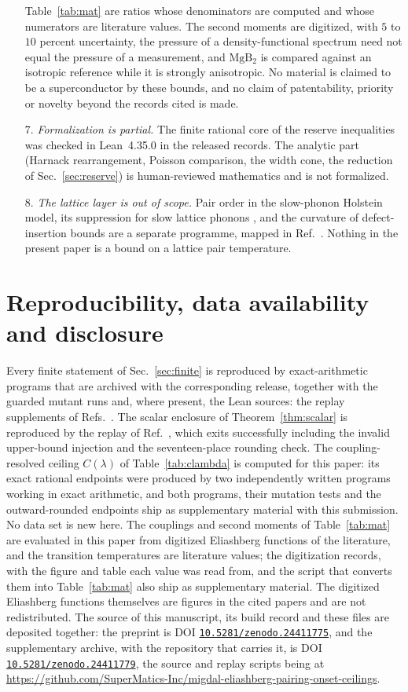 \documentclass[aps,10pt,superscriptaddress,floatfix,amsmath,amssymb,nofootinbib]{revtex4-2}
\newcommand{\DOI}[1]{\href{https://doi.org/#1}{\nolinkurl{#1}}}
\newcommand*{\PAPERDOI}{10.5281/zenodo.24411775}
\newcommand*{\SUPPLEMENTDOI}{10.5281/zenodo.24411779}
\begin{document}
\begin{enumerate}
Table~\ref{tab:mat} are ratios whose denominators are computed and whose numerators are
literature values. The second moments are digitized, with $5$ to $10$ percent uncertainty,
the pressure of a density-functional spectrum need not equal the pressure of a measurement,
and $\mathrm{MgB_{2}}$ is compared against an isotropic reference while it is strongly
anisotropic. No material is claimed to be a superconductor by these bounds, and no claim of
patentability, priority or novelty beyond the records cited is made.
\item[\rm 7.] \emph{Formalization is partial.} The finite rational core of the reserve
inequalities was checked in Lean~4.35.0 in the released records. The analytic part (Harnack
rearrangement, Poisson comparison, the width cone, the reduction of
Sec.~\ref{sec:reserve}) is human-reviewed mathematics and is not formalized.
\item[\rm 8.] \emph{The lattice layer is out of scope.} Pair order in the slow-phonon
Holstein model, its suppression for slow lattice phonons \cite{slowphonon}, and the
curvature of defect-insertion bounds \cite{limits} are a separate programme, mapped in
Ref.~\cite{capstone}. Nothing in the present paper is a bound on a lattice pair temperature.
\end{enumerate}

\section{Reproducibility, data availability and disclosure}\label{sec:repro}

Every finite statement of Sec.~\ref{sec:finite} is reproduced by exact-arithmetic programs
that are archived with the corresponding release, together with the guarded mutant runs and,
where present, the Lean sources: the replay supplements of Refs.~\cite{univglue,optimum,
finiteenergy,anisosharp,msvertex}. The scalar enclosure of Theorem~\ref{thm:scalar} is
reproduced by the replay of Ref.~\cite{gamma}, which exits successfully including the invalid
upper-bound injection and the seventeen-place rounding check. The coupling-resolved ceiling
$C(\lambda)$ of Table~\ref{tab:clambda} is computed for this paper: its exact rational
endpoints were produced by two independently written programs working in exact arithmetic,
and both programs, their mutation tests and the outward-rounded endpoints ship as
supplementary material with this submission. No data set is new here. The couplings and
second moments of Table~\ref{tab:mat} are evaluated in this paper from digitized Eliashberg
functions of the literature, and the transition temperatures are literature values; the
digitization records, with the figure and table each value was read from, and the script that
converts them into Table~\ref{tab:mat} also ship as supplementary material. The digitized
Eliashberg functions themselves are figures in the cited papers and are not redistributed.
The source of this manuscript, its build record and these files are deposited together:
the preprint is DOI \DOI{\PAPERDOI}, and the supplementary archive, with the repository
that carries it, is DOI \DOI{\SUPPLEMENTDOI}, the source and replay scripts being at
\url{https://github.com/SuperMatics-Inc/migdal-eliashberg-pairing-onset-ceilings}.
\end{document}
